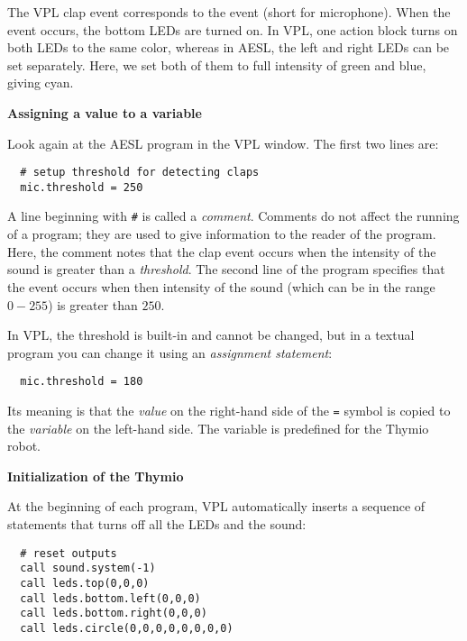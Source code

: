 The VPL clap event corresponds to the  event (short for
microphone). When the event occurs, the bottom LEDs are turned on. In
VPL, one action block turns on both LEDs to the same color, whereas in
AESL, the left and right LEDs can be set separately. Here, we set both
of them to full intensity of green and blue, giving cyan.

\textbf{\large Assigning a value to a variable}

Look again at the AESL program in the VPL window. The first two lines are:
\begin{footnotesize}
\begin{verbatim}
  # setup threshold for detecting claps
  mic.threshold = 250
\end{verbatim}
\end{footnotesize}

A line beginning with \verb+#+ is called a \emph{comment}. Comments do
not affect the running of a program; they are used to give information
to the reader of the program. Here, the comment notes that the clap
event occurs when the intensity of the sound is greater than a
\emph{threshold}. The second line of the program specifies that the
event occurs when then intensity of the sound (which can be in the range
$0-255$) is greater than $250$.

In VPL, the threshold is built-in and cannot be changed, but in a
textual program you can change it using an \emph{assignment statement}:
\begin{footnotesize}
\begin{verbatim}
  mic.threshold = 180
\end{verbatim}
\end{footnotesize}
Its meaning is that the \emph{value} on the right-hand side of the
\verb+=+ symbol is copied to the \emph{variable} on the left-hand side.
The variable  is predefined for the Thymio robot.

\textbf{\large Initialization of the Thymio}

At the beginning of each program, VPL automatically inserts a sequence
of statements that turns off all the LEDs and the sound:

\begin{footnotesize}
\begin{verbatim}
  # reset outputs
  call sound.system(-1)
  call leds.top(0,0,0)
  call leds.bottom.left(0,0,0)
  call leds.bottom.right(0,0,0)
  call leds.circle(0,0,0,0,0,0,0,0)
\end{verbatim}
\end{footnotesize}

